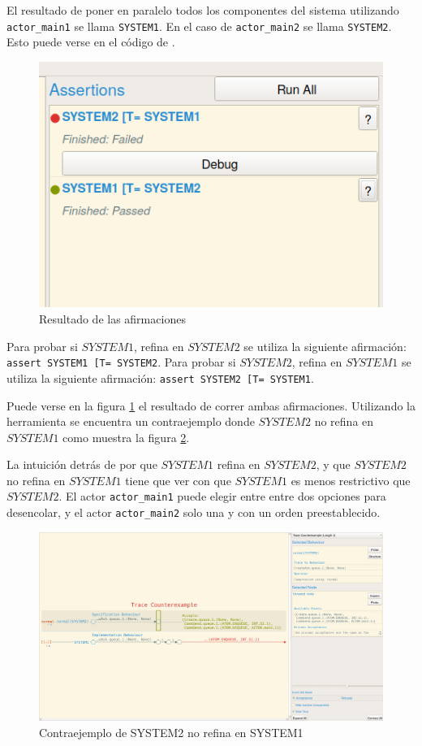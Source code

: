 El resultado de poner en paralelo todos los componentes del sistema utilizando \verb=actor_main1= se llama \verb=SYSTEM1=. En el caso de \verb=actor_main2= se llama \verb=SYSTEM2=. Esto puede verse en el código de \CSPm.

\begin{figure}[H]
\begin{center}
\includegraphics[width=5 cm]{img/trazas.png}
\caption{Resultado de las afirmaciones}\label{modelo:verifica}
\end{center}
\end{figure}

Para probar si $SYSTEM1$, refina en $SYSTEM2$ se utiliza la siguiente afirmación: \verb$assert SYSTEM1 [T= SYSTEM2$. Para probar si $SYSTEM2$, refina en $SYSTEM1$ se utiliza la siguiente afirmación: \verb$assert SYSTEM2 [T= SYSTEM1$.

Puede verse en la figura \ref{modelo:verifica} el resultado de correr ambas afirmaciones. Utilizando la herramienta se encuentra un contraejemplo donde $SYSTEM2$ no refina en $SYSTEM1$ como muestra la figura \ref{modelo:contraejemplo}.

La intuición detrás de por que $SYSTEM1$ refina en $SYSTEM2$, y que $SYSTEM2$ no refina en $SYSTEM1$ tiene que ver con que $SYSTEM1$ es menos restrictivo que $SYSTEM2$. El actor \verb=actor_main1= puede elegir entre entre dos opciones para desencolar, y el actor \verb=actor_main2= solo una y con un orden preestablecido.

\begin{figure}[H]
\begin{center}
\includegraphics[width=15 cm]{img/contraejemplo.png}
\caption{Contraejemplo de SYSTEM2 no refina en SYSTEM1}\label{modelo:contraejemplo}
\end{center}
\end{figure}
 
